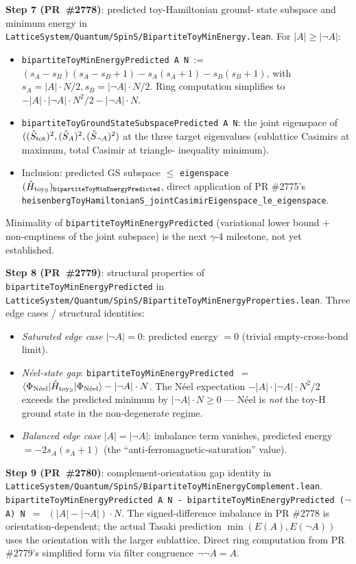 \documentclass[a4paper,11pt]{article}
\begin{document}
\textbf{Step 7 (PR~\#2778)}: predicted toy-Hamiltonian ground-
state subspace and minimum energy in
\texttt{LatticeSystem/Quantum/SpinS/BipartiteToyMinEnergy.lean}.
For $|A| \ge |\neg A|$:
\begin{itemize}
\item \texttt{bipartiteToyMinEnergyPredicted A N}~:=~
$(s_A - s_B)(s_A - s_B + 1) - s_A(s_A+1) - s_B(s_B+1)$, with
$s_A = |A|\cdot N/2, s_B = |\neg A|\cdot N/2$. Ring computation
simplifies to $-|A|\cdot|\neg A|\cdot N^2/2 - |\neg A|\cdot N$.
\item \texttt{bipartiteToyGroundStateSubspacePredicted A N}: the
joint eigenspace of $((\hat S_{\rm tot})^2, (\hat S_A)^2,
(\hat S_{\neg A})^2)$ at the three target eigenvalues
(sublattice Casimirs at maximum, total Casimir at triangle-
inequality minimum).
\item Inclusion: predicted GS subspace $\le$ \texttt{eigenspace}
$(\hat H_{\rm toy_S})_{\texttt{bipartiteToyMinEnergyPredicted}}$,
direct application of PR \#2775's
\texttt{heisenbergToyHamiltonianS\_jointCasimirEigenspace\_le\_eigenspace}.
\end{itemize}
Minimality of \texttt{bipartiteToyMinEnergyPredicted} (variational
lower bound + non-emptiness of the joint subspace) is the next
$\gamma$-4 milestone, not yet established.

\textbf{Step 8 (PR~\#2779)}: structural properties of
\texttt{bipartiteToyMinEnergyPredicted} in
\texttt{LatticeSystem/Quantum/SpinS/BipartiteToyMinEnergyProperties.lean}.
Three edge cases / structural identities:
\begin{itemize}
\item \emph{Saturated edge case} $|\neg A| = 0$: predicted energy
$= 0$ (trivial empty-cross-bond limit).
\item \emph{Néel-state gap}:
\texttt{bipartiteToyMinEnergyPredicted}~$=$
$\langle\Phi_{\rm N\acute eel}|\hat H_{\rm toy_S}|\Phi_{\rm N\acute eel}\rangle
- |\neg A|\cdot N$. The Néel expectation
$-|A|\cdot|\neg A|\cdot N^2/2$ exceeds the predicted minimum by
$|\neg A|\cdot N \ge 0$ — Néel is \emph{not} the toy-H ground
state in the non-degenerate regime.
\item \emph{Balanced edge case} $|A| = |\neg A|$: imbalance term
vanishes, predicted energy $= -2 s_A(s_A+1)$ (the
``anti-ferromagnetic-saturation'' value).
\end{itemize}

\textbf{Step 9 (PR~\#2780)}: complement-orientation gap identity
in
\texttt{LatticeSystem/Quantum/SpinS/BipartiteToyMinEnergyComplement.lean}.
\texttt{bipartiteToyMinEnergyPredicted A N -
bipartiteToyMinEnergyPredicted ($\neg$A) N $=$
$(|A| - |\neg A|)\cdot N$}. The signed-difference imbalance in
PR \#2778 is orientation-dependent; the actual Tasaki prediction
$\min(E(A), E(\neg A))$ uses the orientation with the larger
sublattice. Direct ring computation from PR \#2779's simplified
form via filter congruence $\neg\neg A = A$.
\end{document}
